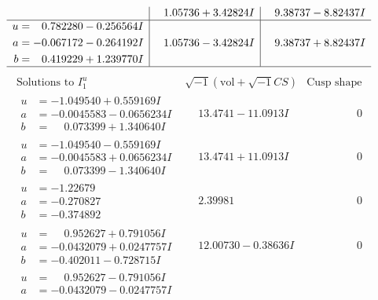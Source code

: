 \documentclass[1p]{elsarticle_modified}
\theoremstyle{definition}
\newcommand{\I}{\sqrt{-1}}
\begin{document}
$$\begin{array}{c|c|c}
 & \phantom{-}1.05736 + 3.42824 I & \phantom{-}9.38737 - 8.82437 I \\ \hline\begin{aligned}
u &= \phantom{-}0.782280 - 0.256564 I \\
a &= -0.067172 - 0.264192 I \\
b &= \phantom{-}0.419229 + 1.239770 I\end{aligned}
 & \phantom{-}1.05736 - 3.42824 I & \phantom{-}9.38737 + 8.82437 I\\
 \hline 
 \end{array}$$\newpage$$\begin{array}{c|c|c}  
\text{Solutions to }I^u_{1}& \I (\text{vol} + \sqrt{-1}CS) & \text{Cusp shape}\\
 \hline 
\begin{aligned}
u &= -1.049540 + 0.559169 I \\
a &= -0.0045583 - 0.0656234 I \\
b &= \phantom{-}0.073399 + 1.340640 I\end{aligned}
 & \phantom{-}13.4741 - 11.0913 I & \phantom{-0.000000 } 0 \\ \hline\begin{aligned}
u &= -1.049540 - 0.559169 I \\
a &= -0.0045583 + 0.0656234 I \\
b &= \phantom{-}0.073399 - 1.340640 I\end{aligned}
 & \phantom{-}13.4741 + 11.0913 I & \phantom{-0.000000 } 0 \\ \hline\begin{aligned}
u &= -1.22679\phantom{ +0.000000I} \\
a &= -0.270827\phantom{ +0.000000I} \\
b &= -0.374892\phantom{ +0.000000I}\end{aligned}
 & \phantom{-}2.39981\phantom{ +0.000000I} & \phantom{-0.000000 } 0 \\ \hline\begin{aligned}
u &= \phantom{-}0.952627 + 0.791056 I \\
a &= -0.0432079 + 0.0247757 I \\
b &= -0.402011 - 0.728715 I\end{aligned}
 & \phantom{-}12.00730 - 0.38636 I & \phantom{-0.000000 } 0 \\ \hline\begin{aligned}
u &= \phantom{-}0.952627 - 0.791056 I \\
a &= -0.0432079 - 0.0247757 I \\

\end{aligned}
\end{array}$$
\end{document}
